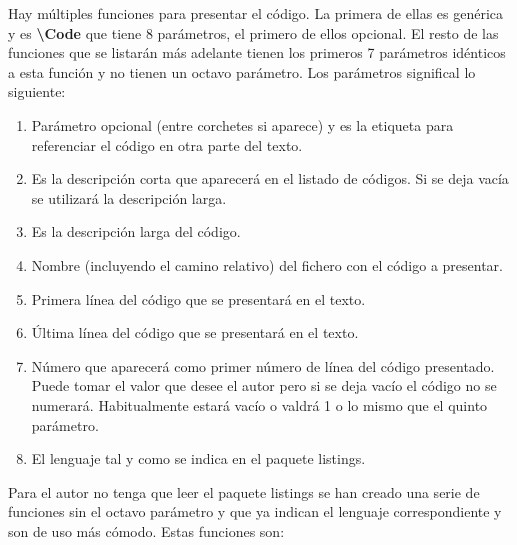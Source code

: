 Hay múltiples funciones para presentar el código. La primera de ellas es genérica y es \textbf{\textbackslash Code} que tiene 8 parámetros, el primero de ellos opcional. El resto de las funciones que se listarán más adelante tienen los primeros 7 parámetros idénticos a esta función y no tienen un octavo parámetro. Los parámetros significal lo siguiente:
\begin{enumerate}
  \item Parámetro opcional (entre corchetes si aparece) y es la etiqueta para referenciar el código en otra parte del texto.
  \item Es la descripción corta que aparecerá en el listado de códigos. Si se deja vacía se utilizará la descripción larga.
  \item Es la descripción larga del código.
  \item Nombre (incluyendo el camino relativo) del fichero con el código a presentar.
  \item Primera línea del código que se presentará en el texto.
  \item Última línea del código que se presentará en el texto.
  \item Número que aparecerá como primer número de línea del código presentado. Puede tomar el valor que desee el autor pero si se deja vacío el código no se numerará. Habitualmente estará vacío o valdrá 1 o lo mismo que el quinto parámetro.
  \item El lenguaje tal y como se indica en el paquete listings.
\end{enumerate}

Para el autor no tenga que leer el paquete listings se han creado una serie de funciones sin el octavo parámetro y que ya indican el lenguaje correspondiente y son de uso más cómodo. Estas funciones son:

